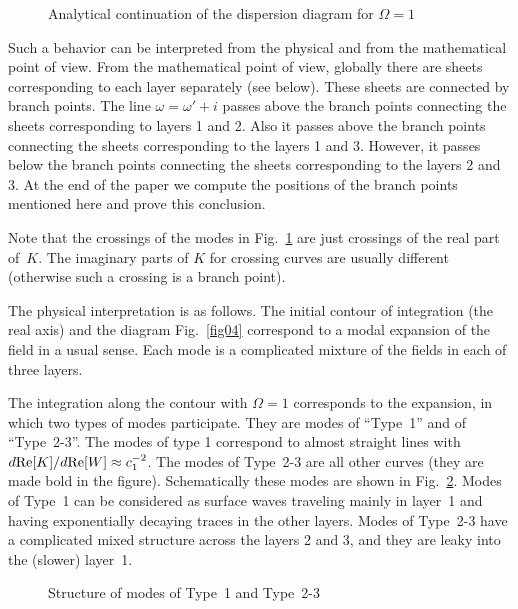 \documentclass[12pt]{article}
\begin{document}
\begin{figure}[ht]
\centerline{}
\caption{Analytical continuation of the dispersion diagram for $\Omega=1$} 
\label{fig06}
\end{figure}

Such a behavior can be interpreted from the physical and from the mathematical point of view. 
From the mathematical point of view, globally there are sheets corresponding to each layer separately (see below). These sheets are connected by branch points. The line $\omega = \omega' + i$ passes above the 
branch points connecting the sheets corresponding to layers 1 and 2. Also it passes above the 
branch points connecting the sheets corresponding to the layers 1 and 3. However, it passes below the branch points connecting the sheets corresponding to the layers 2 and 3. 
At the end of the paper we compute the positions of the branch points mentioned here 
and prove this conclusion.

Note that the crossings of the modes in Fig.~\ref{fig06} are just crossings of the real part of~$K$.
The imaginary parts of $K$ for crossing curves are usually different (otherwise such a crossing is a
branch point).  

The physical interpretation is as follows. The initial contour of integration (the real axis) and the 
diagram Fig.~\ref{fig04} correspond to a modal expansion of the field in a usual sense. Each mode is a complicated mixture of the fields in each of three layers. 

The integration along the contour with $\Omega = 1$ corresponds to the expansion, in which two types of modes participate. They are modes of ``Type~1'' and of ``Type~2-3''. The modes of type 1 correspond to almost straight lines with $d {\rm Re}[K]/ d {\rm Re}[W] \approx c_1^{-2}$. 
The modes of Type~2-3 are all other curves (they are made bold in the figure). Schematically these modes are shown in Fig.~\ref{fig07}. Modes of Type~1 can be considered as surface waves traveling mainly in layer~1 and having exponentially decaying traces in the other layers. Modes of Type~2-3 have a complicated mixed 
structure across the layers 2 and 3, and they are leaky into the (slower) layer~1. 

\begin{figure}[ht]
\centerline{}
\caption{Structure of modes of Type~1 and Type~2-3} 
\label{fig07}
\end{figure}
\end{document}
